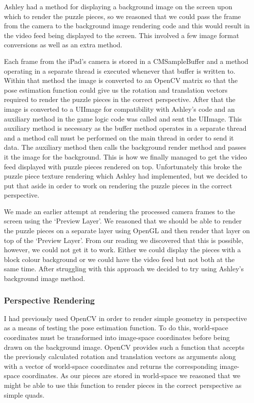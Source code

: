 \documentclass{article}
\begin{document}
Ashley had a method for displaying a background image on the screen upon which to render the puzzle pieces, so we reasoned that we could pass the frame from the camera to the background image rendering code and this would result in the video feed being displayed to the screen. This involved a few image format conversions as well as an extra method.

Each frame from the iPad's camera is stored in a CMSampleBuffer and a method operating in a separate thread is executed whenever that buffer is written to. Within that method the image is converted to an OpenCV matrix so that the pose estimation function could give us the rotation and translation vectors required to render the puzzle pieces in the correct perspective. %
After that the image is converted to a UIImage for compatibility with Ashley's code and an auxiliary method in the game logic code was called and sent the UIImage. This auxiliary method is necessary as the buffer method operates in a separate thread and a method call must be performed on the main thread in order to send it data. The auxiliary method then calls the background render method and passes it the image for the background. %
This is how we finally managed to get the video feed displayed with puzzle pieces rendered on top. Unfortunately this broke the puzzle piece texture rendering which Ashley had implemented, but we decided to put that aside in order to work on rendering the puzzle pieces in the correct perspective.

We made an earlier attempt at rendering the processed camera frames to the screen using the `Preview Layer'. We reasoned that we should be able to render the puzzle pieces on a separate layer using OpenGL and then render that layer on top of the `Preview Layer'. From our reading we discovered that this is possible, however, we could not get it to work. Either we could display the pieces with a block colour background or we could have the video feed but not both at the same time. After struggling with this approach we decided to try using Ashley's background image method.

\subsubsection{Perspective Rendering}

I had previously used OpenCV in order to render simple geometry in perspective as a means of testing the pose estimation function. To do this, world-space coordinates must be transformed into image-space coordinates before being drawn on the background image. OpenCV provides such a function that accepts the previously calculated rotation and translation vectors as arguments along with a vector of world-space coordinates and returns the corresponding image-space coordinates. As our pieces are stored in world-space we reasoned that we might be able to use this function to render pieces in the correct perspective as simple quads. 
\end{document}
